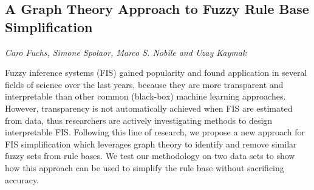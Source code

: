 \documentclass[../booklet.tex]{subfiles}
\begin{document}
\subsection[A Graph Theory Approach to Fuzzy Rule Base Simplification. {\it Caro Fuchs, Simone Spolaor, Marco S. Nobile and Uzay Kaymak}]{A Graph Theory Approach to Fuzzy Rule Base Simplification}
   

\begin{center}
  {\it Caro Fuchs, Simone Spolaor, Marco S. Nobile and Uzay Kaymak}
\end{center}

\vskip 0.8cm


Fuzzy inference systems (FIS) gained popularity and found application in several fields of science over the last years, because they are more transparent and interpretable than other common (black-box) machine learning approaches.
However, transparency is not automatically achieved when FIS are estimated from data, thus researchers are actively investigating methods to design interpretable FIS.
Following this line of research, we propose a new approach for FIS simplification which leverages graph theory to identify and remove similar fuzzy sets from rule bases.
We test our methodology on two data sets to show how this approach can be used to simplify the rule base without sacrificing accuracy.

\end{document}
